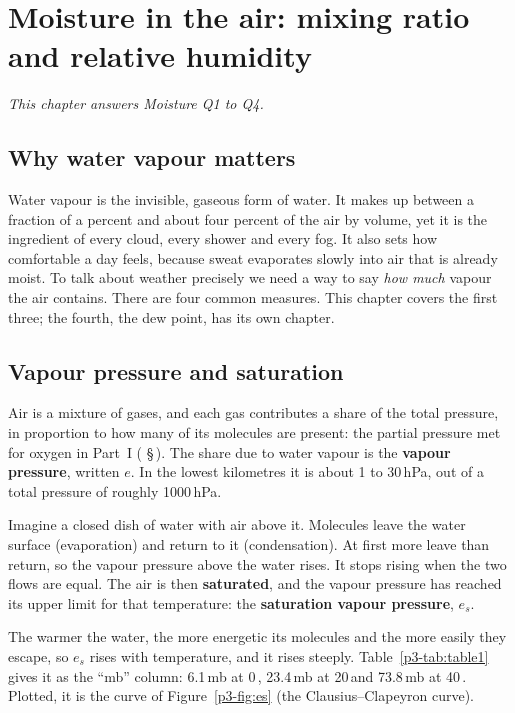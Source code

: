 \chapter{Moisture in the air: mixing ratio and relative humidity}\label{p3-ch:moisture}


\textit{This chapter answers Moisture Q1 to Q4.}

\section{Why water vapour matters}

Water vapour is the invisible, gaseous form of water. It makes up between a fraction of a percent and about four percent of the air by volume, yet it is the ingredient of every cloud, every shower and every fog. It also sets how comfortable a day feels, because sweat evaporates slowly into air that is already moist. To talk about weather precisely we need a way to say \emph{how much} vapour the air contains. There are four common measures. This chapter covers the first three; the fourth, the dew point, has its own chapter.

\section{Vapour pressure and saturation}\label{p3-sec:vp}

Air is a mixture of gases, and each gas contributes a share of the total pressure, in proportion to how many of its molecules are present: the partial pressure met for oxygen in Part~I ( \S\,). The share due to water vapour is the \textbf{vapour pressure}, written $e$. In the lowest kilometres it is about 1 to 30\,hPa, out of a total pressure of roughly 1000\,hPa.

Imagine a closed dish of water with air above it. Molecules leave the water surface (evaporation) and return to it (condensation). At first more leave than return, so the vapour pressure above the water rises. It stops rising when the two flows are equal. The air is then \textbf{saturated}, and the vapour pressure has reached its upper limit for that temperature: the \textbf{saturation vapour pressure}, $e_s$.

The warmer the water, the more energetic its molecules and the more easily they escape, so $e_s$ rises with temperature, and it rises steeply. Table~\ref{p3-tab:table1} gives it as the ``mb'' column: 6.1\,mb at 0\,\degC, 23.4\,mb at 20\,\degC and 73.8\,mb at 40\,\degC. Plotted, it is the curve of Figure~\ref{p3-fig:es} (the Clausius--Clapeyron curve).


